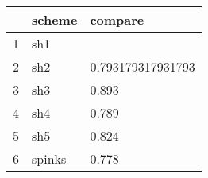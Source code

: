 \begin{table}[ht]
\centering
\begin{tabular}{rll}
  \hline
 & scheme & compare \\ 
  \hline
1 & sh1 &  \\ 
  2 & sh2 & 0.793179317931793 \\ 
  3 & sh3 & 0.893 \\ 
  4 & sh4 & 0.789 \\ 
  5 & sh5 & 0.824 \\ 
  6 & spinks & 0.778 \\ 
   \hline
\end{tabular}
\end{table}
